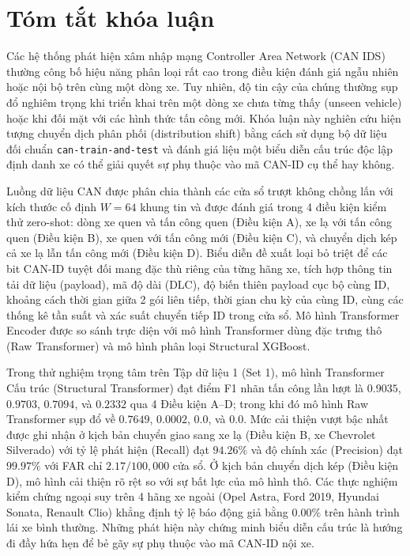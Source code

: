 \documentclass[12pt, a4paper, reqno, oneside]{book}
\begin{document}
\chapter*{Tóm tắt khóa luận}
\vspace{20pt}

Các hệ thống phát hiện xâm nhập mạng Controller Area Network (CAN IDS) thường công bố hiệu năng phân loại rất cao trong điều kiện đánh giá ngẫu nhiên hoặc nội bộ trên cùng một dòng xe. Tuy nhiên, độ tin cậy của chúng thường sụp đổ nghiêm trọng khi triển khai trên một dòng xe chưa từng thấy (unseen vehicle) hoặc khi đối mặt với các hình thức tấn công mới. Khóa luận này nghiên cứu hiện tượng chuyển dịch phân phối (distribution shift) bằng cách sử dụng bộ dữ liệu đối chuẩn \texttt{can-train-and-test} và đánh giá liệu một biểu diễn cấu trúc độc lập định danh xe có thể giải quyết sự phụ thuộc vào mã CAN-ID cụ thể hay không.

Luồng dữ liệu CAN được phân chia thành các cửa sổ trượt không chồng lấn với kích thước cố định $W = 64$ khung tin và được đánh giá trong 4 điều kiện kiểm thử zero-shot: dòng xe quen và tấn công quen (Điều kiện A), xe lạ với tấn công quen (Điều kiện B), xe quen với tấn công mới (Điều kiện C), và chuyển dịch kép cả xe lạ lẫn tấn công mới (Điều kiện D). Biểu diễn đề xuất loại bỏ triệt để các bit CAN-ID tuyệt đối mang đặc thù riêng của từng hãng xe, tích hợp thông tin tải dữ liệu (payload), mã độ dài (DLC), độ biến thiên payload cục bộ cùng ID, khoảng cách thời gian giữa 2 gói liên tiếp, thời gian chu kỳ của cùng ID, cùng các thống kê tần suất và xác suất chuyển tiếp ID trong cửa sổ. Mô hình Transformer Encoder được so sánh trực diện với mô hình Transformer dùng đặc trưng thô (Raw Transformer) và mô hình phân loại Structural XGBoost.

Trong thử nghiệm trọng tâm trên Tập dữ liệu 1 (Set 1), mô hình Transformer Cấu trúc (Structural Transformer) đạt điểm F1 nhãn tấn công lần lượt là $0.9035$, $0.9703$, $0.7094$, và $0.2332$ qua 4 Điều kiện A--D; trong khi đó mô hình Raw Transformer sụp đổ về $0.7649$, $0.0002$, $0.0$, và $0.0$. Mức cải thiện vượt bậc nhất được ghi nhận ở kịch bản chuyển giao sang xe lạ (Điều kiện B, xe Chevrolet Silverado) với tỷ lệ phát hiện (Recall) đạt $94.26\%$ và độ chính xác (Precision) đạt $99.97\%$ với FAR chỉ $2.17 / 100,000$ cửa sổ. Ở kịch bản chuyển dịch kép (Điều kiện D), mô hình cải thiện rõ rệt so với sự bất lực của mô hình thô. Các thực nghiệm kiểm chứng ngoại suy trên 4 hãng xe ngoài (Opel Astra, Ford 2019, Hyundai Sonata, Renault Clio) khẳng định tỷ lệ báo động giả bằng $0.00\%$ trên hành trình lái xe bình thường. Những phát hiện này chứng minh biểu diễn cấu trúc là hướng đi đầy hứa hẹn để bẻ gãy sự phụ thuộc vào mã CAN-ID nội xe.
\end{document}
